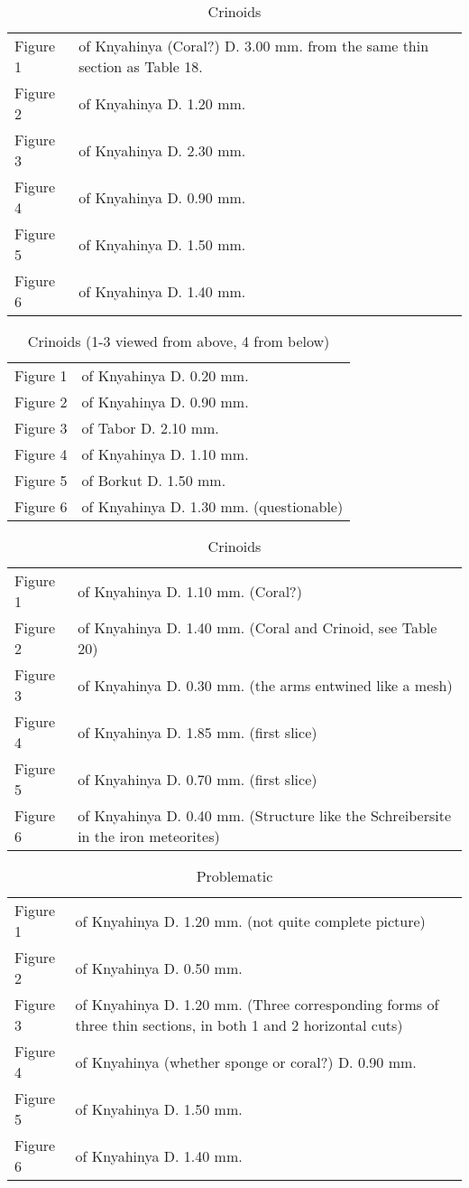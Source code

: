 \documentclass[a4paper, 12pt, oneside]{article}
\begin{document}
\begin{table}[ht!]
\caption{Crinoids}
\centering
\begin{tabular}{ p{2cm} p{10cm} }
\hline
 Figure 1 & of Knyahinya (Coral?) D. 3.00 mm. from the same thin section as Table 18. \\
 Figure 2 & of Knyahinya D. 1.20 mm. \\
 Figure 3 & of Knyahinya D. 2.30 mm. \\
 Figure 4 & of Knyahinya D. 0.90 mm. \\
 Figure 5 & of Knyahinya D. 1.50 mm. \\
 Figure 6 & of Knyahinya D. 1.40 mm.
\end{tabular}
\label{table:28}
\end{table}
\begin{table}[ht!]
\caption{Crinoids (1-3 viewed from above, 4 from below)}
\centering
\begin{tabular}{ p{2cm} p{10cm} }
\hline
 Figure 1 & of Knyahinya D. 0.20 mm. \\
 Figure 2 & of Knyahinya D. 0.90 mm. \\
 Figure 3 & of Tabor D. 2.10 mm. \\
 Figure 4 & of Knyahinya D. 1.10 mm. \\
 Figure 5 & of Borkut D. 1.50 mm. \\
 Figure 6 & of Knyahinya D. 1.30 mm. (questionable)
\end{tabular}
\label{table:29}
\end{table}
\begin{table}[ht!]
\caption{Crinoids}
\centering
\begin{tabular}{ p{2cm} p{10cm} }
\hline
 Figure 1 & of Knyahinya D. 1.10 mm. (Coral?) \\
 Figure 2 & of Knyahinya D. 1.40 mm. (Coral and Crinoid, see Table 20) \\
 Figure 3 & of Knyahinya D. 0.30 mm. (the arms entwined like a mesh) \\
 Figure 4 & of Knyahinya D. 1.85 mm. (first slice) \\
 Figure 5 & of Knyahinya D. 0.70 mm. (first slice) \\
 Figure 6 & of Knyahinya D. 0.40 mm. (Structure like the Schreibersite in the iron meteorites) \\
\end{tabular}
\label{table:30}
\end{table}
\begin{table}[ht!]
\caption{Problematic}
\centering
\begin{tabular}{ p{2cm} p{10cm} }
\hline
 Figure 1 & of Knyahinya D. 1.20 mm. (not quite complete picture) \\
 Figure 2 & of Knyahinya D. 0.50 mm. \\
 Figure 3 & of Knyahinya D. 1.20 mm. (Three corresponding forms of three thin sections, in both 1 and 2 horizontal cuts) \\
 Figure 4 & of Knyahinya (whether sponge or coral?) D. 0.90 mm. \\
 Figure 5 & of Knyahinya D. 1.50 mm. \\
 Figure 6 & of Knyahinya D. 1.40 mm.
\end{tabular}
\label{table:31}
\end{table}
\end{document}
